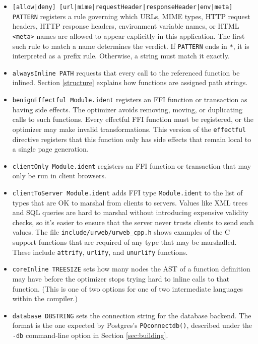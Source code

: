 \documentclass{article}
\begin{document}
\begin{itemize}
\item \texttt{[allow|deny] [url|mime|requestHeader|responseHeader|env|meta] PATTERN} registers a rule governing which URLs, MIME types, HTTP request headers, HTTP response headers, environment variable names, or HTML \texttt{<meta>} names are allowed to appear explicitly in this application.  The first such rule to match a name determines the verdict.  If \texttt{PATTERN} ends in \texttt{*}, it is interpreted as a prefix rule.  Otherwise, a string must match it exactly.
\item \texttt{alwaysInline PATH} requests that every call to the referenced function be inlined.  Section \ref{structure} explains how functions are assigned path strings.
\item \texttt{benignEffectful Module.ident} registers an FFI function or transaction as having side effects.  The optimizer avoids removing, moving, or duplicating calls to such functions.  Every effectful FFI function must be registered, or the optimizer may make invalid transformations.  This version of the \texttt{effectful} directive registers that this function only has side effects that remain local to a single page generation.
\item \texttt{clientOnly Module.ident} registers an FFI function or transaction that may only be run in client browsers.
\item \texttt{clientToServer Module.ident} adds FFI type \texttt{Module.ident} to the list of types that are OK to marshal from clients to servers.  Values like XML trees and SQL queries are hard to marshal without introducing expensive validity checks, so it's easier to ensure that the server never trusts clients to send such values.  The file \texttt{include/urweb/urweb\_cpp.h} shows examples of the C support functions that are required of any type that may be marshalled.  These include \texttt{attrify}, \texttt{urlify}, and \texttt{unurlify} functions.
\item \texttt{coreInline TREESIZE} sets how many nodes the AST of a function definition may have before the optimizer stops trying hard to inline calls to that function.  (This is one of two options for one of two intermediate languages within the compiler.)
\item \texttt{database DBSTRING} sets the connection string for the database backend.  The format is the one expected by Postgres's \texttt{PQconnectdb()}, described under the \texttt{-db} command-line option in Section \ref{sec:building}.

\end{itemize}
\end{document}
